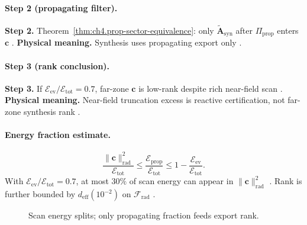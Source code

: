 \paragraph{Step 2 (propagating filter).}
\textbf{Step 2.} Theorem~\ref{thm:ch4.prop-sector-equivalence}: only \(\widetilde{\mathbf{A}}_{\mathrm{syn}}\) after \(\Pi_{\mathrm{prop}}\) enters \(\mathbf{c}\)
\cite{harrington2001,devaney2004,stratton1941,hansen1988}.
\textbf{Physical meaning.} Synthesis uses propagating export only \cite{stratton1941,harrington2001}.

\paragraph{Step 3 (rank conclusion).}
\textbf{Step 3.} If \(\mathcal{E}_{\mathrm{ev}}/\mathcal{E}_{\mathrm{tot}}=0.7\), far-zone \(\mathbf{c}\) is low-rank despite rich near-field scan
\cite{stratton1941,hansen1988,jackson1999,devaney2004,harrington2001}.
\textbf{Physical meaning.} Near-field truncation excess is reactive certification, not far-zone synthesis rank \cite{harrington2001,stratton1941}.

\paragraph{Energy fraction estimate.}
\begin{equation}
\label{eq:ch4.ex-nf-ff-energy}
\frac{\|\mathbf{c}\|_{\mathrm{rad}}^{2}}{\mathcal{E}_{\mathrm{tot}}}
\le
\frac{\mathcal{E}_{\mathrm{prop}}}{\mathcal{E}_{\mathrm{tot}}}
\le
1-\frac{\mathcal{E}_{\mathrm{ev}}}{\mathcal{E}_{\mathrm{tot}}}.
\end{equation}
With \(\mathcal{E}_{\mathrm{ev}}/\mathcal{E}_{\mathrm{tot}}=0.7\), at most \(30\%\) of scan energy can appear in \(\|\mathbf{c}\|_{\mathrm{rad}}^{2}\)
\cite{stratton1941,jackson1999,harrington2001,devaney2004,hansen1988}. Rank is further bounded by \(d_{\mathrm{eff}}(10^{-2})\) on \(\mathcal{F}_{\mathrm{rad}}\)
\cite{harrington2001,devaney2004}.

\begin{figure}[t]
\centering
{}
\caption{Scan energy splits; only propagating fraction feeds export rank.}
\label{fig:ch4.ex-nf-energy-split}
\end{figure}

